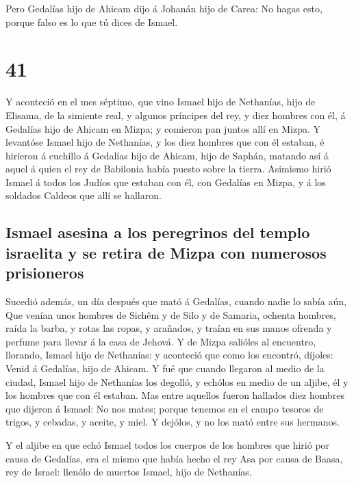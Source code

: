  Pero Gedalías hijo de Ahicam dijo á Johanán hijo de
Carea: No hagas esto, porque falso es lo que tú dices de Ismael.

\hypertarget{section-24-41}{%
\section{41}\label{section-24-41}}

 Y aconteció en el mes séptimo, que vino Ismael hijo de
Nethanías, hijo de Elisama, de la simiente real, y algunos príncipes del
rey, y diez hombres con él, á Gedalías hijo de Ahicam en Mizpa; y
comieron pan juntos allí en Mizpa.  Y levantóse Ismael
hijo de Nethanías, y los diez hombres que con él estaban, é hirieron á
cuchillo á Gedalías hijo de Ahicam, hijo de Saphán, matando así á aquel
á quien el rey de Babilonia había puesto sobre la tierra. 
Asimismo hirió Ismael á todos los Judíos que estaban con él, con
Gedalías en Mizpa, y á los soldados Caldeos que allí se hallaron.

\hypertarget{ismael-asesina-a-los-peregrinos-del-templo-israelita-y-se-retira-de-mizpa-con-numerosos-prisioneros}{%
\subsection{Ismael asesina a los peregrinos del templo israelita y se
retira de Mizpa con numerosos
prisioneros}\label{ismael-asesina-a-los-peregrinos-del-templo-israelita-y-se-retira-de-mizpa-con-numerosos-prisioneros}}

 Sucedió además, un día después que mató á Gedalías,
cuando nadie lo sabía aún,  Que venían unos hombres de
Sichêm y de Silo y de Samaria, ochenta hombres, raída la barba, y rotas
las ropas, y arañados, y traían en sus manos ofrenda y perfume para
llevar á la casa de Jehová.  Y de Mizpa salióles al
encuentro, llorando, Ismael hijo de Nethanías: y aconteció que como los
encontró, díjoles: Venid á Gedalías, hijo de Ahicam.  Y
fué que cuando llegaron al medio de la ciudad, Ismael hijo de Nethanías
los degolló, y echólos en medio de un aljibe, él y los hombres que con
él estaban.  Mas entre aquellos fueron hallados diez
hombres que dijeron á Ismael: No nos mates; porque tenemos en el campo
tesoros de trigos, y cebadas, y aceite, y miel. Y dejólos, y no los mató
entre sus hermanos.

 Y el aljibe en que echó Ismael todos los cuerpos de los
hombres que hirió por causa de Gedalías, era el mismo que había hecho el
rey Asa por causa de Baasa, rey de Israel: llenólo de muertos Ismael,
hijo de Nethanías.

